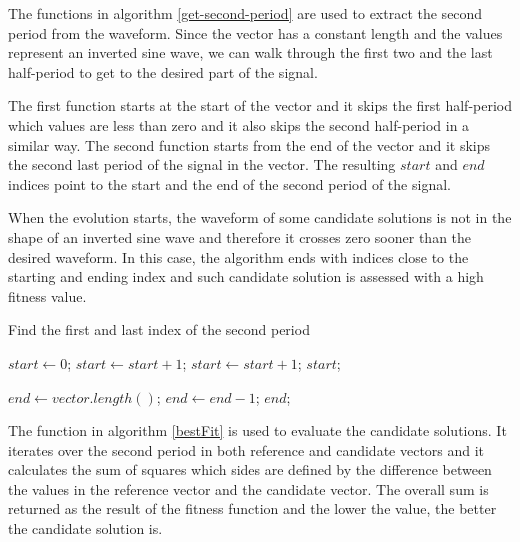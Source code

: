 The functions in algorithm \ref{get-second-period} are used to extract the second period from the waveform. Since the vector has a constant length and the values represent an inverted sine wave, we can walk through the first two and the last half-period to get to the desired part of the signal.

The first function starts at the start of the vector and it skips the first half-period which values are less than zero and it also skips the second half-period in a similar way. The second function starts from the end of the vector and it skips the second last period of the signal in the vector. The resulting $start$ and $end$ indices point to the start and the end of the second period of the signal.

When the evolution starts, the waveform of some candidate solutions is not in the shape of an inverted sine wave and therefore it crosses zero sooner than the desired waveform. In this case, the algorithm ends with indices close to the starting and ending index and such candidate solution is assessed with a high fitness value.

    \begin{algorithm}
    \caption{Find the first and last index of the second period}
    \label{get-second-period}
    \begin{algorithmic}[1]
            \State $start \gets 0$;
                \State $start \gets start + 1$;
            \EndWhile
                \State $start \gets start + 1$;
            \EndWhile
            \State \Return $start$;
        \EndFunction
        \State

            \State $end \gets vector.length()$;
                \State $end \gets end - 1$;
            \EndWhile
            \State \Return $end$;
        \EndFunction
    \end{algorithmic}
    \end{algorithm}

The function in algorithm \ref{bestFit} is used to evaluate the candidate solutions. It iterates over the second period in both reference and candidate vectors and it calculates the sum of squares which sides are defined by the difference between the values in the reference vector and the candidate vector. The overall sum is returned as the result of the fitness function and the lower the value, the better the candidate solution is.

